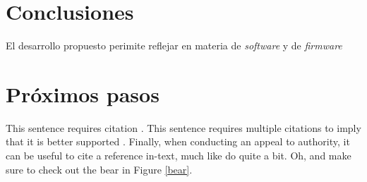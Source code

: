 \documentclass[10pt, a4paper, twocolumn]{article} %
\begin{document}
\subsection{}



\section{Conclusiones}

El desarrollo propuesto perimite reflejar en materia de \textit{software} y de \textit{firmware} 


\section{Próximos pasos}




This sentence requires citation \citep{Reference1}. This sentence requires multiple citations to imply that it is better supported \citep{Reference2,Reference3}. Finally, when conducting an appeal to authority, it can be useful to cite a reference in-text, much like \cite{Reference1} do quite a bit. Oh, and make sure to check out the bear in Figure \ref{bear}.


\printbibliography[title={Bibliography}] %

\end{document}
